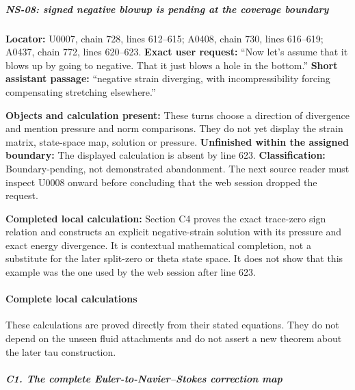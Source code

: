 \subparagraph{NS-08: signed negative blowup is pending at the coverage
boundary}\label{ns-08-signed-negative-blowup-is-pending-at-the-coverage-boundary}

\textbf{Locator:} U0007, chain 728, lines 612--615; A0408, chain 730,
lines 616--619; A0437, chain 772, lines 620--623. \textbf{Exact user
request:} ``Now let's assume that it blows up by going to negative. That
it just blows a hole in the bottom.'' \textbf{Short assistant passage:}
``negative strain diverging, with incompressibility forcing compensating
stretching elsewhere.''

\textbf{Objects and calculation present:} These turns choose a direction
of divergence and mention pressure and norm comparisons. They do not yet
display the strain matrix, state-space map, solution or pressure.
\textbf{Unfinished within the assigned boundary:} The displayed
calculation is absent by line 623. \textbf{Classification:}
Boundary-pending, not demonstrated abandonment. The next source reader
must inspect U0008 onward before concluding that the web session dropped
the request.

\textbf{Completed local calculation:} Section C4 proves the exact
trace-zero sign relation and constructs an explicit negative-strain
solution with its pressure and exact energy divergence. It is contextual
mathematical completion, not a substitute for the later split-zero or
theta state space. It does not show that this example was the one used
by the web session after line 623.

\paragraph{Complete local
calculations}\label{complete-local-calculations}

These calculations are proved directly from their stated equations. They
do not depend on the unseen fluid attachments and do not assert a new
theorem about the later tau construction.

\subparagraph{C1. The complete Euler-to-Navier--Stokes correction
map}\label{c1.-the-complete-euler-to-navierstokes-correction-map}

